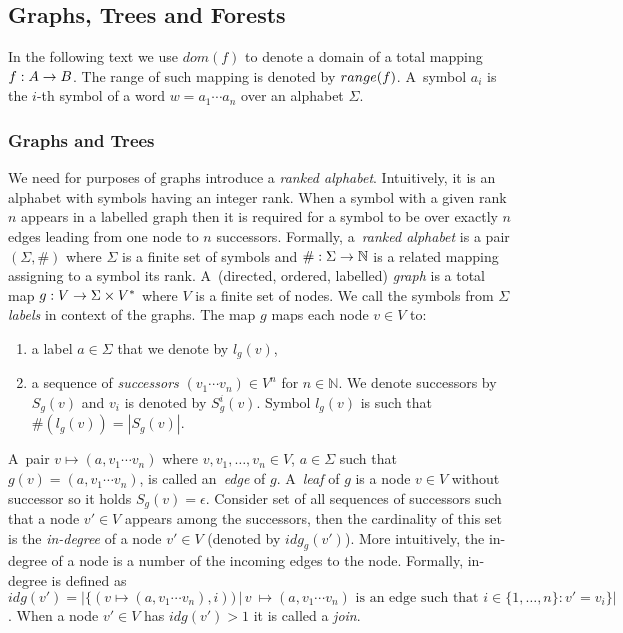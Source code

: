 \documentclass[a4paper, 12pt]{article}
\begin{document}
\subsection{Graphs, Trees and Forests}
\label{sec:graph}

In the following text we use $dom(f)$ to denote a domain of a total mapping $f: A \rightarrow B$.
The range of such mapping is denoted by $range(f)$.
A~symbol $a_i$ is the $i$-th symbol of a word $w = a_1 \cdots a_n$ over an alphabet $\Sigma$.

\subsubsection{Graphs and Trees}
\label{subsec:graph}
We need for purposes of graphs introduce a \emph{ranked alphabet}.
Intuitively, it is an alphabet with symbols having an integer rank.
When a symbol with a given rank $n$ appears in a labelled graph
then it is required for a symbol to be over exactly $n$ edges
leading from one node to $n$ successors.
Formally, a~\emph{ranked alphabet} is a pair $(\Sigma, \#)$ where $\Sigma$ is
a finite set of symbols and $\#: \Sigma \rightarrow \mathbb{N}$ is a related mapping
assigning to a symbol its rank.
A~(directed, ordered, labelled) \emph{graph} is a total map $g: V \rightarrow \Sigma \times V^{*}$ where $V$ is a finite set of nodes.
We call the symbols from $\Sigma$ \emph{labels} in context of the graphs.
The map $g$ maps each node $v\in V$ to:
\begin{enumerate}
	\item a label $a \in \Sigma$ that we denote by $l_g(v)$,
	\item a sequence of \emph{successors} $(v_1 \cdots v_n) \in V^n$ for $n \in \mathbb{N}$.
		We denote successors by $S_g(v)$ and $v_i$ is denoted by $S^i_g(v)$.
	    Symbol $l_g(v)$ is such that $\#(l_g(v)) = |S_g(v)|$.
\end{enumerate}

A~pair $v \mapsto (a, v_1 \cdots v_n)$ where $v, v_1, \ldots, v_n \in V$,
$a \in \Sigma$ such that $g(v) = (a, v_1 \cdots v_n)$, is called an~\emph{edge} of $g$.
A~\emph{leaf} of $g$ is a node $v \in V$ without successor so it holds $S_g(v) = \epsilon$.
Consider set of all sequences of successors such that a node $v' \in V$ appears among the successors, then
the cardinality of this set is the \emph{in-degree} of a node $v' \in V$ (denoted by $idg_g(v')$).
More intuitively, the in-degree of a node is a number of the incoming edges to the node.
Formally, in-degree is defined as
$idg(v') = |\{(v \mapsto (a, v_1 \cdots v_n),i)) \,|\, v~\mapsto (a, v_1 \cdots v_n)
\text{ is an edge such that } i \in \{1,\ldots,n\}: v' = v_i\}|$.
When a node $v' \in V$ has $idg(v') > 1$ it is called a \emph{join}.
\end{document}
